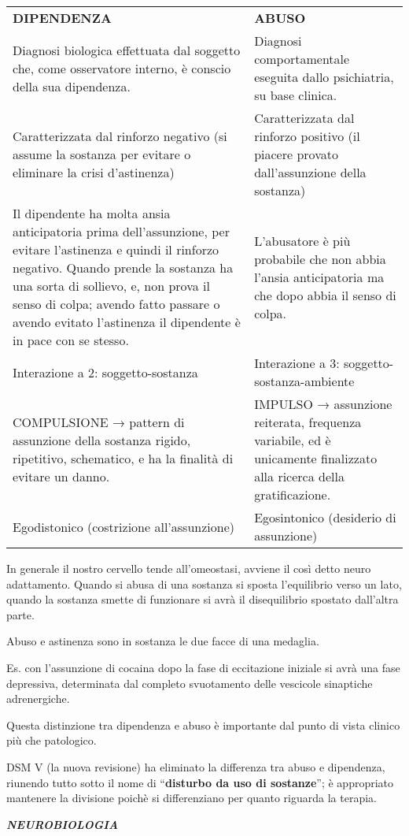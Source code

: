 \documentclass[]{article}
\begin{document}
\begin{longtable}[]{@{}ll@{}}
\toprule
\textbf{DIPENDENZA} & \textbf{ABUSO}\tabularnewline
Diagnosi biologica effettuata dal soggetto che, come osservatore
interno, è conscio della sua dipendenza. & Diagnosi comportamentale
eseguita dallo psichiatria, su base clinica.\tabularnewline
Caratterizzata dal rinforzo negativo (si assume la sostanza per evitare
o eliminare la crisi d'astinenza) & Caratterizzata dal rinforzo positivo
(il piacere provato dall'assunzione della sostanza)\tabularnewline
Il dipendente ha molta ansia anticipatoria prima dell'assunzione, per
evitare l'astinenza e quindi il rinforzo negativo. Quando prende la
sostanza ha una sorta di sollievo, e, non prova il senso di colpa;
avendo fatto passare o avendo evitato l'astinenza il dipendente è in
pace con se stesso. & L'abusatore è più probabile che non abbia l'ansia
anticipatoria ma che dopo abbia il senso di colpa.\tabularnewline
Interazione a 2: soggetto-sostanza & Interazione a 3:
soggetto-sostanza-ambiente\tabularnewline
COMPULSIONE → pattern di assunzione della sostanza rigido, ripetitivo,
schematico, e ha la finalità di evitare un danno. & IMPULSO → assunzione
reiterata, frequenza variabile, ed è unicamente finalizzato alla ricerca
della gratificazione.\tabularnewline
Egodistonico (costrizione all'assunzione) & Egosintonico (desiderio di
assunzione)\tabularnewline
\bottomrule
\end{longtable}

In generale il nostro cervello tende all'omeostasi, avviene il così
detto neuro adattamento. Quando si abusa di una sostanza si sposta
l'equilibrio verso un lato, quando la sostanza smette di funzionare si
avrà il disequilibrio spostato dall'altra parte.

Abuso e astinenza sono in sostanza le due facce di una medaglia.

Es. con l'assunzione di cocaina dopo la fase di eccitazione iniziale si
avrà una fase depressiva, determinata dal completo svuotamento delle
vescicole sinaptiche adrenergiche.

Questa distinzione tra dipendenza e abuso è importante dal punto di
vista clinico più che patologico.

DSM V (la nuova revisione) ha eliminato la differenza tra abuso e
dipendenza, riunendo tutto sotto il nome di ``\textbf{disturbo da uso di
sostanze}''; è appropriato mantenere la divisione poichè si
differenziano per quanto riguarda la terapia.

\textbf{\emph{NEUROBIOLOGIA}}
\end{document}
